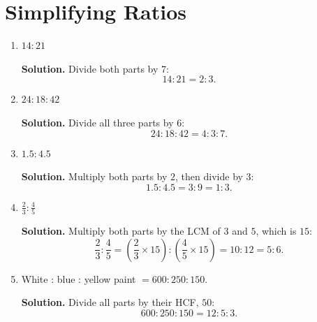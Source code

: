 \documentclass[12pt,a4paper]{article}
\begin{document}
\section*{Simplifying Ratios}
\begin{enumerate}
\item \(14:21\)

\textbf{Solution.} Divide both parts by \(7\):
\[
14:21=2:3.
\]

\item \(24:18:42\)

\textbf{Solution.} Divide all three parts by \(6\):
\[
24:18:42=4:3:7.
\]

\item \(1.5:4.5\)

\textbf{Solution.} Multiply both parts by \(2\), then divide by \(3\):
\[
1.5:4.5=3:9=1:3.
\]

\item \(\frac{2}{3}:\frac{4}{5}\)

\textbf{Solution.} Multiply both parts by the LCM of \(3\) and \(5\), which is \(15\):
\[
\frac{2}{3}:\frac{4}{5}
= \left(\frac{2}{3}\times 15\right):\left(\frac{4}{5}\times 15\right)
=10:12=5:6.
\]

\item White : blue : yellow paint \(=600:250:150\).

\textbf{Solution.} Divide all parts by their HCF, \(50\):
\[
600:250:150=12:5:3.
\]
\end{enumerate}
\end{document}
